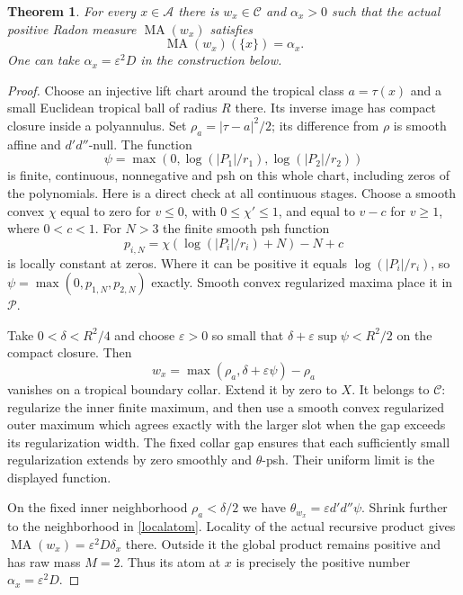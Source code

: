 \documentclass[11pt]{article}
\newcommand{\DD}{d'd''}
\newcommand{\MA}{\operatorname{MA}}
\newcommand{\C}{\mathcal C}
\newtheorem{theorem}{Theorem}
\theoremstyle{remark}\newtheorem{remark}[theorem]{Remark}
\begin{document}
\begin{theorem}\label{atom}
For every $x\in\mathscr A$ there is $w_x\in\C$ and
$\alpha_x>0$ such that the actual positive Radon measure
$\MA(w_x)$ satisfies
\[
 \MA(w_x)(\{x\})=\alpha_x.
\]
One can take $\alpha_x=\varepsilon^2D$ in the construction below.
\end{theorem}
\begin{proof}
Choose an injective lift chart around the tropical class
$a=\tau(x)$ and a small Euclidean tropical ball of radius $R$ there.
Its inverse image has compact closure inside a polyannulus.
Set $\rho_a=|\tau-a|^2/2$; its difference from $\rho$ is
smooth affine and $\DD$-null.
The function
\[
 \psi=\max(0,\log(|P_1|/r_1),\log(|P_2|/r_2))
\]
is finite, continuous, nonnegative and psh on this whole chart,
including zeros of the polynomials. Here is a direct check at all
continuous stages. Choose a smooth convex $\chi$ equal to zero for
$v\le0$, with $0\le\chi'\le1$, and equal to $v-c$ for $v\ge1$,
where $0<c<1$. For $N>3$ the finite smooth psh function
\[
 p_{i,N}=\chi(\log(|P_i|/r_i)+N)-N+c
\]
is locally constant at zeros. Where it can be positive it equals
$\log(|P_i|/r_i)$, so $\psi=\max(0,p_{1,N},p_{2,N})$ exactly.
Smooth convex regularized maxima place it in $\mathscr P$.

Take $0<\delta<R^2/4$ and choose $\varepsilon>0$ so small that
$\delta+\varepsilon\sup\psi<R^2/2$ on the compact closure.
Then
\[
 w_x=\max(\rho_a,\delta+\varepsilon\psi)-\rho_a
\]
vanishes on a tropical boundary collar. Extend it by zero to $X$.
It belongs to $\C$: regularize the inner finite maximum, and then
use a smooth convex regularized outer maximum which agrees exactly
with the larger slot when the gap exceeds its regularization
width. The fixed collar gap ensures that each sufficiently small
regularization extends by zero smoothly and $\theta$-psh.
Their uniform limit is the displayed function.

On the fixed inner neighborhood $\rho_a<\delta/2$ we have
$\theta_{w_x}=\varepsilon\DD\psi$. Shrink further to the
neighborhood in \eqref{localatom}. Locality of the actual recursive
product gives
$\MA(w_x)=\varepsilon^2D\delta_x$ there.
Outside it the global product remains positive and has raw mass
$M=2$. Thus its atom at $x$ is precisely the positive number
$\alpha_x=\varepsilon^2D$.
\end{proof}
\end{document}
